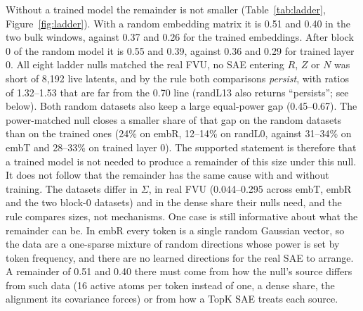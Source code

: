 \documentclass{article}
\newcommand{\Sig}{\Sigma}
\begin{document}
Without a trained model the remainder is not smaller (Table~\ref{tab:ladder}, Figure~\ref{fig:ladder}). With a random embedding matrix it is 0.51 and 0.40 in the two bulk windows, against 0.37 and 0.26 for the trained embeddings. After block 0 of the random model it is 0.55 and 0.39, against 0.36 and 0.29 for trained layer 0. All eight ladder nulls matched the real FVU, no SAE entering $R$, $Z$ or $N$ was short of 8,192 live latents, and by the rule both comparisons \emph{persist}, with ratios of 1.32--1.53 that are far from the 0.70 line (randL13 also returns ``persists''; see below). Both random datasets also keep a large equal-power gap (0.45--0.67). The power-matched null closes a smaller share of that gap on the random datasets than on the trained ones (24\% on embR, 12--14\% on randL0, against 31--34\% on embT and 28--33\% on trained layer 0). The supported statement is therefore that a trained model is not needed to produce a remainder of this size under this null. It does not follow that the remainder has the same cause with and without training. The datasets differ in $\Sig$, in real FVU (0.044--0.295 across embT, embR and the two block-0 datasets) and in the dense share their nulls need, and the rule compares sizes, not mechanisms. One case is still informative about what the remainder can be. In embR every token is a single random Gaussian vector, so the data are a one-sparse mixture of random directions whose power is set by token frequency, and there are no learned directions for the real SAE to arrange. A remainder of 0.51 and 0.40 there must come from how the null's source differs from such data (16 active atoms per token instead of one, a dense share, the alignment its covariance forces) or from how a TopK SAE treats each source.
\end{document}
